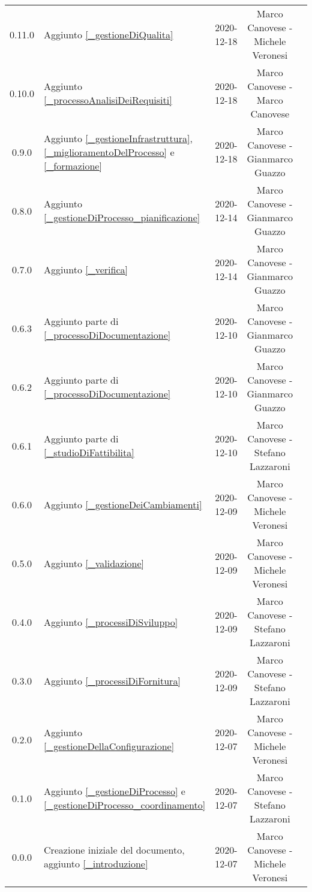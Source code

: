 \begin{center}
\begin{longtable}{|c|p{5cm}|c|c|c|}
		0.11.0 & Aggiunto \ref{_gestioneDiQualita} & 2020-12-18 & Marco Canovese - Michele Veronesi \\
		0.10.0 & Aggiunto \ref{_processoAnalisiDeiRequisiti} & 2020-12-18 & Marco Canovese - Marco Canovese  \\
		0.9.0 & Aggiunto \ref{_gestioneInfrastruttura}, \ref{_miglioramentoDelProcesso} e \ref{_formazione} & 2020-12-18 & Marco Canovese - Gianmarco Guazzo  \\
		0.8.0 & Aggiunto \ref{_gestioneDiProcesso_pianificazione} & 2020-12-14 & Marco Canovese - Gianmarco Guazzo \\
		0.7.0 & Aggiunto \ref{_verifica} & 2020-12-14& Marco Canovese - Gianmarco Guazzo \\
		0.6.3 & Aggiunto parte di \ref{_processoDiDocumentazione} & 2020-12-10 & Marco Canovese - Gianmarco Guazzo \\
		0.6.2 & Aggiunto parte di \ref{_processoDiDocumentazione} & 2020-12-10 & Marco Canovese - Gianmarco Guazzo \\
		0.6.1 & Aggiunto parte di \ref{_studioDiFattibilita} & 2020-12-10 & Marco Canovese - Stefano Lazzaroni  \\
		0.6.0 & Aggiunto \ref{_gestioneDeiCambiamenti} & 2020-12-09 & Marco Canovese - Michele Veronesi \\
		0.5.0 & Aggiunto \ref{_validazione} & 2020-12-09 & Marco Canovese - Michele Veronesi  \\
		0.4.0 & Aggiunto \ref{_processiDiSviluppo} & 2020-12-09 & Marco Canovese - Stefano Lazzaroni  \\
		0.3.0 & Aggiunto \ref{_processiDiFornitura} & 2020-12-09 & Marco Canovese - Stefano Lazzaroni \\
		0.2.0 & Aggiunto \ref{_gestioneDellaConfigurazione} & 2020-12-07 & Marco Canovese - Michele Veronesi  \\
		0.1.0 & Aggiunto \ref{_gestioneDiProcesso} e \ref{_gestioneDiProcesso_coordinamento} & 2020-12-07 & Marco Canovese - Stefano Lazzaroni \\
		0.0.0 & Creazione iniziale del documento, aggiunto \ref{_introduzione} & 2020-12-07 & Marco Canovese - Michele Veronesi \\
		
		\hline
	\end{longtable}
\end{center}